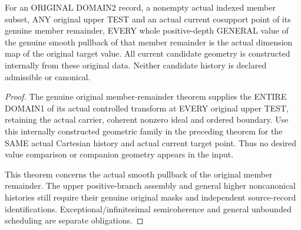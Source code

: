 \begin{theorem}
\label{hir:original-member-untested-curve-full-smooth-value}
\leanok
For an ORIGINAL DOMAIN2 record, a nonempty actual indexed member subset,
ANY original upper TEST and an actual current cosupport point of its
genuine member remainder, EVERY whole positive-depth GENERAL value of
the genuine smooth pullback of that member remainder is the actual
dimension map of the original target value. All current candidate
geometry is constructed internally from these original data.
Neither candidate history is declared admissible or canonical.
\end{theorem}
\begin{proof}
The genuine original member-remainder theorem supplies the ENTIRE
DOMAIN1 of its actual controlled transform at EVERY original upper
TEST, retaining the actual carrier, coherent nonzero ideal and ordered
boundary. Use this internally constructed geometric family in the
preceding theorem for the SAME actual Cartesian history and actual
current target point. Thus no desired value comparison or companion
geometry appears in the input.

This theorem concerns the actual smooth pullback of the original member
remainder. The upper positive-branch assembly and general higher
noncanonical histories still require their genuine original masks and
independent source-record identifications. Exceptional/infinitesimal
semicoherence and general unbounded scheduling are separate obligations.
\end{proof}

